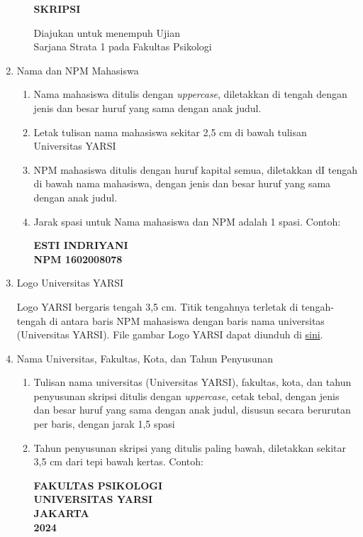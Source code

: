 \documentclass[
  indonesian,
  letterpaper,
]{scrbook}
\begin{document}
\begin{enumerate}
\begin{enumerate}
    \setmainfont{Times New Roman}
    \begin{center} 
    \textbf{SKRIPSI}

    Diajukan untuk menempuh Ujian \\Sarjana Strata 1  pada Fakultas Psikologi
    \end{center} 
  \end{enumerate}
\item
  Nama dan NPM Mahasiswa

  \begin{enumerate}
  \def\labelenumii{\alph{enumii}.}
  \item
    Nama mahasiswa ditulis dengan \emph{uppercase}, diletakkan di tengah
    dengan jenis dan besar huruf yang sama dengan anak judul.
  \item
    Letak tulisan nama mahasiswa sekitar 2,5 cm di bawah tulisan
    Universitas YARSI
  \item
    NPM mahasiswa ditulis dengan huruf kapital semua, diletakkan dI
    tengah di bawah nama mahasiswa, dengan jenis dan besar huruf yang
    sama dengan anak judul.
  \item
    Jarak spasi untuk Nama mahasiswa dan NPM adalah 1 spasi. Contoh:

    \setmainfont{Times New Roman}
    \begin{center} 
    \textbf{ESTI INDRIYANI\\
    NPM 1602008078}
    \end{center} 
  \end{enumerate}
\item
  Logo Universitas YARSI

  Logo YARSI bergaris tengah 3,5 cm. Titik tengahnya terletak di
  tengah-tengah di antara baris NPM mahasiswa dengan baris nama
  universitas (Universitas YARSI). File gambar Logo YARSI dapat diunduh
  di
  \href{https://drive.google.com/file/d/11trNCsQdbG1ErnliS7XHTR6DsUtex-Xv/view?usp=sharing}{sini}.
\item
  Nama Universitas, Fakultas, Kota, dan Tahun Penyusunan

  \begin{enumerate}
  \def\labelenumii{\alph{enumii}.}
  \item
    Tulisan nama universitas (Universitas YARSI), fakultas, kota, dan
    tahun penyusunan skripsi ditulis dengan \emph{uppercase}, cetak
    tebal, dengan jenis dan besar huruf yang sama dengan anak judul,
    disusun secara berurutan per baris, dengan jarak 1,5 spasi
  \item
    Tahun penyusunan skripsi yang ditulis paling bawah, diletakkan
    sekitar 3,5 cm dari tepi bawah kertas. Contoh:

    \setmainfont{Times New Roman}
    \begin{center} 
    \textbf{FAKULTAS PSIKOLOGI\\
    UNIVERSITAS YARSI\\
    JAKARTA \\
    2024
    }
    \end{center}
  \end{enumerate}
\end{enumerate}
\end{document}
